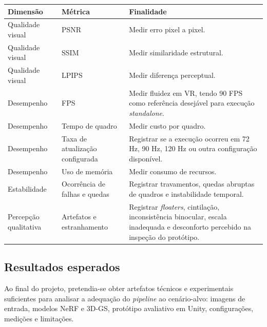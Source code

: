 \begin{quadro}[H]
\centering
\footnotesize
\caption{Métricas previstas para avaliação da solução.}
\label{qua:metricas_avaliacao}
\renewcommand{\arraystretch}{1.2}
\begin{tabularx}{\textwidth}{|p{3.0cm}|p{3.2cm}|X|}
\hline
\textbf{Dimensão} & \textbf{Métrica} & \textbf{Finalidade} \\ \hline

Qualidade visual & PSNR & Medir erro pixel a pixel. \\ \hline

Qualidade visual & SSIM & Medir similaridade estrutural. \\ \hline

Qualidade visual & LPIPS & Medir diferença perceptual. \\ \hline

Desempenho & FPS & Medir fluidez em VR, tendo 90 FPS como referência desejável para execução \textit{standalone}. \\ \hline

Desempenho & Tempo de quadro & Medir custo por quadro. \\ \hline

Desempenho & Taxa de atualização configurada & Registrar se a execução ocorreu em 72 Hz, 90 Hz, 120 Hz ou outra configuração disponível. \\ \hline

Desempenho & Uso de memória & Medir consumo de recursos. \\ \hline

Estabilidade & Ocorrência de falhas e quedas & Registrar travamentos, quedas abruptas de quadros e instabilidade temporal. \\ \hline

Percepção qualitativa & Artefatos e estranhamento & Registrar \textit{floaters}, cintilação, inconsistência binocular, escala inadequada e desconforto percebido na inspeção do protótipo. \\ \hline

\end{tabularx}
\end{quadro}

\subsection{Resultados esperados}

Ao final do projeto, pretendia-se obter artefatos técnicos e experimentais suficientes para analisar a adequação do \textit{pipeline} ao cenário-alvo: imagens de entrada, modelos NeRF e 3D-GS, protótipo avaliativo em Unity, configurações, medições e limitações.

